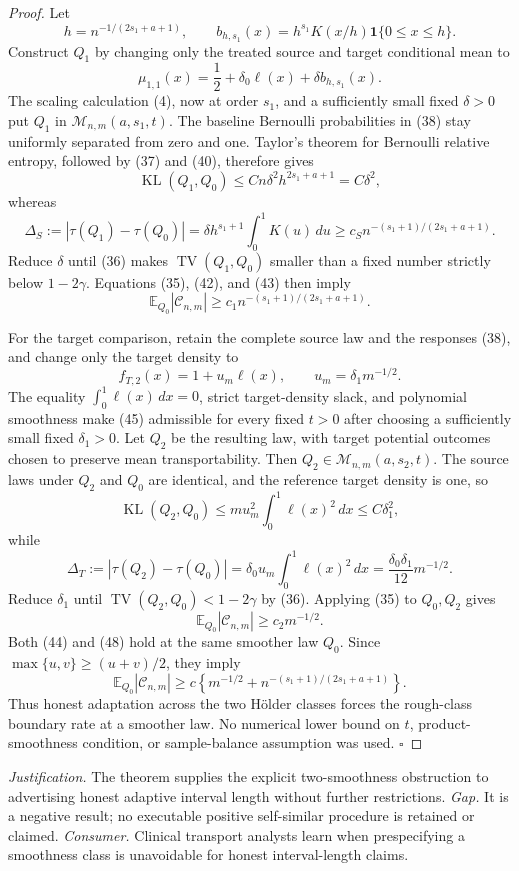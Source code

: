 \documentclass{article}
\begin{document}
\begin{proof}
Let
\[
h=n^{-1/(2s_1+a+1)},
\qquad
b_{h,s_1}(x)=h^{s_1}K(x/h)\mathbf 1\{0\le x\le h\}.
\tag{40}
\]
Construct \(Q_1\) by changing only the treated source and target conditional mean to
\[
\mu_{1,1}(x)=\frac12+\delta_0\ell(x)+\delta b_{h,s_1}(x).
\tag{41}
\]
The scaling calculation (4), now at order \(s_1\), and a sufficiently small fixed \(\delta>0\) put \(Q_1\) in \(\mathcal M_{n,m}(a,s_1,t)\). The baseline Bernoulli probabilities in (38) stay uniformly separated from zero and one. Taylor's theorem for Bernoulli relative entropy, followed by (37) and (40), therefore gives
\[
\operatorname{KL}(Q_1,Q_0)
\le Cn\delta^2h^{2s_1+a+1}
=C\delta^2,
\tag{42}
\]
whereas
\[
\Delta_S:=|\tau(Q_1)-\tau(Q_0)|
=\delta h^{s_1+1}\int_0^1K(u)\,du
\ge c_Sn^{-(s_1+1)/(2s_1+a+1)}.
\tag{43}
\]
Reduce \(\delta\) until (36) makes \(\operatorname{TV}(Q_1,Q_0)\) smaller than a fixed number strictly below \(1-2\gamma\). Equations (35), (42), and (43) then imply
\[
\mathbb E_{Q_0}|\mathcal C_{n,m}|
\ge c_1n^{-(s_1+1)/(2s_1+a+1)}.
\tag{44}
\]

For the target comparison, retain the complete source law and the responses (38), and change only the target density to
\[
f_{T,2}(x)=1+u_m\ell(x),
\qquad
u_m=\delta_1m^{-1/2}.
\tag{45}
\]
The equality \(\int_0^1\ell(x)\,dx=0\), strict target-density slack, and polynomial smoothness make (45) admissible for every fixed \(t>0\) after choosing a sufficiently small fixed \(\delta_1>0\). Let \(Q_2\) be the resulting law, with target potential outcomes chosen to preserve mean transportability. Then \(Q_2\in\mathcal M_{n,m}(a,s_2,t)\). The source laws under \(Q_2\) and \(Q_0\) are identical, and the reference target density is one, so
\[
\operatorname{KL}(Q_2,Q_0)
\le m u_m^2\int_0^1\ell(x)^2\,dx
\le C\delta_1^2,
\tag{46}
\]
while
\[
\Delta_T:=|\tau(Q_2)-\tau(Q_0)|
=\delta_0u_m\int_0^1\ell(x)^2\,dx
=\frac{\delta_0\delta_1}{12}m^{-1/2}.
\tag{47}
\]
Reduce \(\delta_1\) until \(\operatorname{TV}(Q_2,Q_0)<1-2\gamma\) by (36). Applying (35) to \(Q_0,Q_2\) gives
\[
\mathbb E_{Q_0}|\mathcal C_{n,m}|
\ge c_2m^{-1/2}.
\tag{48}
\]
Both (44) and (48) hold at the same smoother law \(Q_0\). Since \(\max\{u,v\}\ge(u+v)/2\), they imply
\[
\mathbb E_{Q_0}|\mathcal C_{n,m}|
\ge c\left\{m^{-1/2}+n^{-(s_1+1)/(2s_1+a+1)}\right\}.
\]
Thus honest adaptation across the two H\"older classes forces the rough-class boundary rate at a smoother law. No numerical lower bound on \(t\), product-smoothness condition, or sample-balance assumption was used. \(\square\)
\end{proof}
\par\smallskip\noindent \textit{Justification.} The theorem supplies the explicit two-smoothness obstruction to advertising honest adaptive interval length without further restrictions. \textit{Gap.} It is a negative result; no executable positive self-similar procedure is retained or claimed. \textit{Consumer.} Clinical transport analysts learn when prespecifying a smoothness class is unavoidable for honest interval-length claims.
\end{document}
